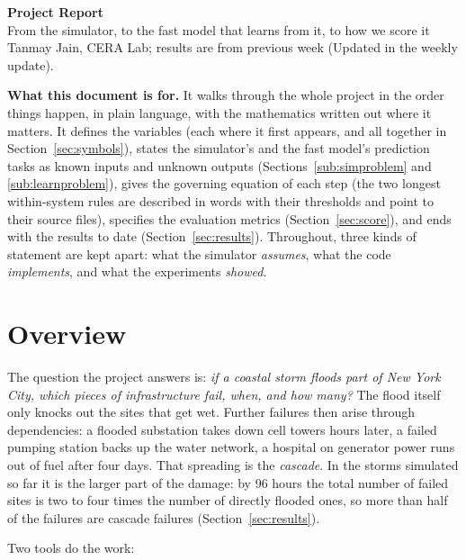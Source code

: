 \documentclass[11pt]{article}
\begin{document}
{\sffamily\color{blue}\LARGE\bfseries Project Report}\\[2pt]
{\sffamily\large From the simulator, to the fast model that learns from it, to how we score it}\\[4pt]
{\small\color{grey} Tanmay Jain, CERA Lab; results are from previous week (Updated in the weekly update).}

\vspace{4pt}
\begin{askbox}
\textbf{What this document is for.} It walks through the whole project in the order things happen, in plain language, with the mathematics written out where it matters. It defines the variables (each where it first appears, and all together in Section~\ref{sec:symbols}), states the simulator's and the fast model's prediction tasks as known inputs and unknown outputs (Sections~\ref{sub:simproblem} and \ref{sub:learnproblem}), gives the governing equation of each step (the two longest within-system rules are described in words with their thresholds and point to their source files), specifies the evaluation metrics (Section~\ref{sec:score}), and ends with the results to date (Section~\ref{sec:results}). Throughout, three kinds of statement are kept apart: what the simulator \emph{assumes}, what the code \emph{implements}, and what the experiments \emph{showed}.
\end{askbox}

\section*{Overview}

The question the project answers is: \emph{if a coastal storm floods part of New York City, which pieces of infrastructure fail, when, and how many?} The flood itself only knocks out the sites that get wet. Further failures then arise through dependencies: a flooded substation takes down cell towers hours later, a failed pumping station backs up the water network, a hospital on generator power runs out of fuel after four days. That spreading is the \emph{cascade}. In the storms simulated so far it is the larger part of the damage: by 96 hours the total number of failed sites is two to four times the number of directly flooded ones, so more than half of the failures are cascade failures (Section~\ref{sec:results}).

Two tools do the work:
\end{document}
